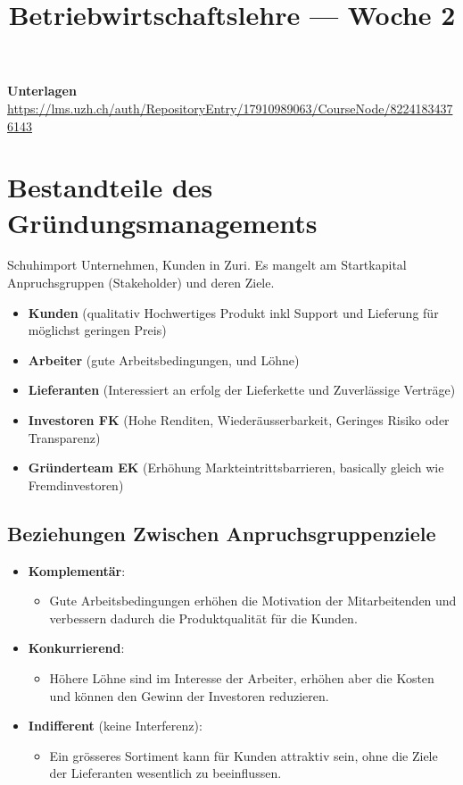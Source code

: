 \documentclass[a4paper]{article}
\title{\textbf{Betriebwirtschaftslehre — Woche 2}}
\begin{document}
    \maketitle
    \textbf{Unterlagen} \url{https://lms.uzh.ch/auth/RepositoryEntry/17910989063/CourseNode/82241834376143}
    \section{Bestandteile des Gründungsmanagements}
    Schuhimport Unternehmen, Kunden in Zuri. Es mangelt am Startkapital
     Anpruchsgruppen (Stakeholder) und deren Ziele.
    \begin{itemize}
        \item \textbf{Kunden} (qualitativ Hochwertiges Produkt inkl Support und Lieferung für möglichst geringen Preis)
        \item \textbf{Arbeiter} (gute Arbeitsbedingungen, und Löhne)
        \item \textbf{Lieferanten} (Interessiert an erfolg der Lieferkette und Zuverlässige Verträge)
        \item \textbf{Investoren FK} (Hohe Renditen, Wiederäusserbarkeit, Geringes Risiko oder Transparenz)
        \item \textbf{Gründerteam EK} (Erhöhung Markteintrittsbarrieren, basically gleich wie Fremdinvestoren)
    \end{itemize}

    \subsection{Beziehungen Zwischen Anpruchsgruppenziele}
    \begin{itemize}
        \item \textbf{Komplementär}: 
        \begin{itemize}
            \item Gute Arbeitsbedingungen erhöhen die Motivation der Mitarbeitenden und verbessern dadurch die Produktqualität für die Kunden.
        \end{itemize}
        \item \textbf{Konkurrierend}: 
        \begin{itemize}
            \item Höhere Löhne sind im Interesse der Arbeiter, erhöhen aber die Kosten und können den Gewinn der Investoren reduzieren.
        \end{itemize}
        \item \textbf{Indifferent} (keine Interferenz):
        \begin{itemize}
            \item  Ein grösseres Sortiment kann für Kunden attraktiv sein, ohne die Ziele der Lieferanten wesentlich zu beeinflussen.
        \end{itemize}
    \end{itemize}
    \pagebreak
\end{document}

